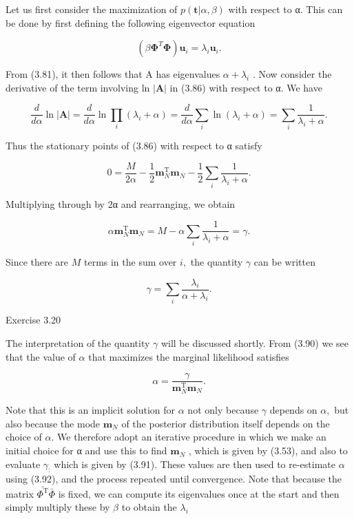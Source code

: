 \documentclass[
  10
]{article}
\begin{document}
Let us first consider the maximization of
\(p ( \mathbf { t } | \alpha , \beta )\) with respect to α. This can be
done by first defining the following eigenvector equation

\[
\left(\beta \boldsymbol {\Phi} ^ {T} \boldsymbol {\Phi}\right) \mathbf {u} _ {i} = \lambda_ {i} \mathbf {u} _ {i}.\tag{3.87}
\]

From (3.81), it then follows that A has eigenvalues
\(\alpha + \lambda _ { i }\) . Now consider the derivative of the term
involving ln \(| \mathbf { A } |\) in (3.86) with respect to α. We have

\[
{\frac {d}{d \alpha}} \ln | {\mathbf A} | = {\frac {d}{d \alpha}} \ln \prod_ {i} (\lambda_ {i} + \alpha) = {\frac {d}{d \alpha}} \sum_ {i} \ln (\lambda_ {i} + \alpha) = \sum_ {i} {\frac {1}{\lambda_ {i} + \alpha}}.\tag{3.88}
\]

Thus the stationary points of (3.86) with respect to α satisfy

\[
0 = \frac {M}{2 \alpha} - \frac {1}{2} \mathbf {m} _ {N} ^ {\mathrm{T}} \mathbf {m} _ {N} - \frac {1}{2} \sum_ {i} \frac {1}{\lambda_ {i} + \alpha}.\tag{3.89}
\]

Multiplying through by 2α and rearranging, we obtain

\[
\alpha \mathbf {m} _ {N} ^ {\mathrm{T}} \mathbf {m} _ {N} = M - \alpha \sum_ {i} \frac {1}{\lambda_ {i} + \alpha} = \gamma .\tag{3.90}
\]

Since there are \(M\) terms in the sum over \(i ,\) the quantity
\(\gamma\) can be written

\[
\gamma = \sum_ {i} \frac {\lambda_ {i}}{\alpha + \lambda_ {i}}.\tag{3.91}
\]

Exercise 3.20

The interpretation of the quantity \(\gamma\) will be discussed shortly.
From (3.90) we see that the value of \(\alpha\) that maximizes the
marginal likelihood satisfies

\[
\alpha = \frac {\gamma}{\mathbf {m} _ {N} ^ {\mathrm{T}} \mathbf {m} _ {N}}.\tag{3.92}
\]

Note that this is an implicit solution for \(\alpha\) not only because
\(\gamma\) depends on \(\alpha ,\) but also because the mode
\(\mathbf { m } _ { N }\) of the posterior distribution itself depends
on the choice of \(\alpha .\) We therefore adopt an iterative procedure
in which we make an initial choice for α and use this to find
\(\mathbf { m } _ { N }\) , which is given by (3.53), and also to
evaluate \(\gamma _ { \mathrm { : } }\) which is given by (3.91). These
values are then used to re-estimate \(\alpha\) using (3.92), and the
process repeated until convergence. Note that because the matrix
\(\bar { \Phi ^ { \mathrm { T } } } \bar { \Phi }\) is fixed, we can
compute its eigenvalues once at the start and then simply multiply these
by \(\beta\) to obtain the \(\lambda _ { i }\)
\end{document}
